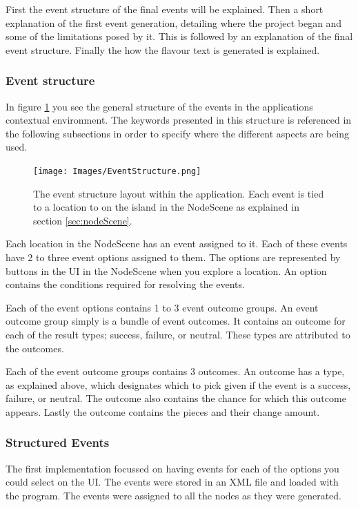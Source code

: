 First the event structure of the final events will be explained. Then a short explanation of the first event generation, detailing where the project began and some of the limitations posed by it. This is followed by an explanation of the final event structure. Finally the how the flavour text is generated is explained.

\subsubsection{Event structure}
In figure \ref{fig:eStruc} you see the general structure of the events in the applications contextual environment. The keywords presented in this structure is referenced in the following subsections in order to specify where the different aspects are being used.

\begin{figure}[h]
    \centering
    \texttt{[image: Images/EventStructure.png]}
    \caption{The event structure layout within the application. Each event is tied to a location to on the island in the NodeScene as explained in section \ref{sec:nodeScene}.}
    \label{fig:eStruc}
\end{figure}

Each location in the NodeScene has an event assigned to it. 
Each of these events have 2 to three event options assigned to them. The options are represented by buttons in the UI in the NodeScene when you explore a location. An option contains the conditions required for resolving the events. 

Each of the event options contains 1 to 3 event outcome groups. An event outcome group simply is a bundle of event outcomes. It contains an outcome for each of the result types; success, failure, or neutral. These types are attributed to the outcomes.

Each of the event outcome groups contains 3 outcomes. An outcome has a type, as explained above, which designates which to pick given if the event is a success, failure, or neutral. The outcome also contains the chance for which this outcome appears. Lastly the outcome contains the pieces and their change amount. 

\subsubsection{Structured Events}
The first implementation focussed on having events for each of the options you could select on the UI. The events were stored in an XML file and loaded with the program. The events were assigned to all the nodes as they were generated.

